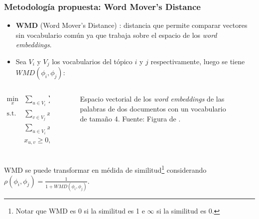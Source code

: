 \documentclass[
	spanish, %
	aspectratio=43, %
	hyperref={pdfencoding=auto,psdextra},
	xcolor={dvipsnames,table,usenames},
]{beamer}
\begin{document}
\begin{frame}[t]
\frametitle{Metodología propuesta: Word Mover's Distance}

\begin{itemize}
  \item \textbf{WMD} (Word Mover's Distance) \cite{kusner2015word}: distancia que permite comparar vectores sin vocabulario común ya que trabaja sobre el espacio de los \textit{word embeddings}. 
  \item Sea  $V_{i}$ y $V_{j}$ los vocabularios del tópico $i$ y $j$ respectivamente, luego se tiene $WMD(\phi_{i}, \phi_{j})$:
\end{itemize}

\vspace*{-0.4in}
\begin{columns}
\begin{column}{0.4\textwidth}

\begin{align}
\underset{x}{\text{min}}&\sum_{u \in V_{i}}\sum_{v \in V_{j}} c_{u,v}x_{u,v} \\ 
\textrm{s.t.} &\sum_{v \in V_{j}}x_{u,v}= \phi_{i,u}, \; u \in V_{i}\\ 
& \sum_{u \in V_{i}}x_{u,v}= \phi_{j,v}, \; v\in V_{j}\\
& x_{u,v} \geq 0,\; u \in V_{i} \;, v \in V_{j}\\ \nonumber
\end{align}

\end{column}

\begin{column}{0.6\textwidth}
\begin{figure}
\caption{Espacio vectorial de los \textit{word embeddings} de las palabras de dos documentos con un vocabulario de tamaño 4. Fuente: Figura de \cite{WMDPy}.}
\label{img:wmd_obama}
\end{figure}
\end{column}

\end{columns}
  WMD se puede transformar en médida de similitud\footnote{Notar que WMD es 0 si la similitud es 1 e $\infty$ si la similitud es 0.} considerando $\rho(\phi_{i}, \phi_{j}) = \frac{1}{1+WMD(\phi_{i}, \phi_{j})}$.

\end{frame}
\end{document}
